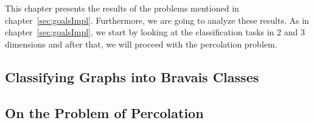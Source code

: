 This chapter presents the results of the problems mentioned in chapter~\ref{sec:goalsImpl}.
Furthermore, we are going to analyze these results. As in chapter~\ref{sec:goalsImpl}, we start
by looking at the classification tasks in 2 and 3 dimensions and after that, we will proceed with the percolation problem.

\subsection{Classifying Graphs into Bravais Classes}


\subsection{On the Problem of Percolation}
